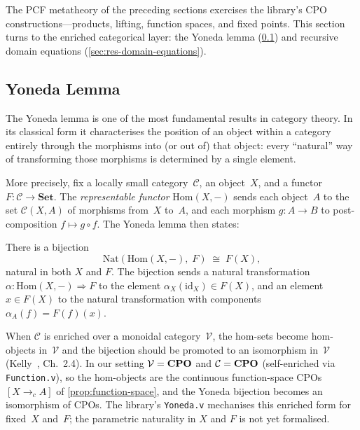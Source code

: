 The PCF metatheory of the preceding sections exercises the library's
CPO constructions---products, lifting, function spaces, and fixed
points.  This section turns to the enriched categorical layer:
the Yoneda lemma (\cref{sec:res-yoneda}) and recursive domain
equations (\cref{sec:res-domain-equations}).

\subsection{Yoneda Lemma}
\label{sec:res-yoneda}


The Yoneda lemma is one of the most fundamental results in category
theory.  In its classical form it characterises the position of an
object within a category entirely through the morphisms into (or out of)
that object: every ``natural'' way of transforming those morphisms is
determined by a single element.

More precisely, fix a locally small category~$\mathcal{C}$, an
object~$X$, and a functor $F : \mathcal{C} \to \mathbf{Set}$.  The
\emph{representable functor} $\mathrm{Hom}(X, -)$ sends each object~$A$
to the set $\mathcal{C}(X, A)$ of morphisms from~$X$ to~$A$, and each
morphism $g : A \to B$ to post-composition $f \mapsto g \circ f$.  The
Yoneda lemma then states:

\begin{theorem}
\label{thm:yoneda-set}
There is a bijection
\[
  \mathrm{Nat}(\mathrm{Hom}(X,-),\; F)
    \;\cong\;
  F(X),
\]
natural in both $X$ and $F$.  The bijection sends a natural
transformation $\alpha : \mathrm{Hom}(X,-) \Rightarrow F$ to the element
$\alpha_X(\mathrm{id}_X) \in F(X)$, and an element $x \in F(X)$ to the
natural transformation with components $\alpha_A(f) = F(f)(x)$.
\end{theorem}

\noindent
When $\mathcal{C}$ is enriched over a monoidal category~$\mathcal{V}$,
the hom-sets become hom-objects in~$\mathcal{V}$ and the bijection
should be promoted to an isomorphism in~$\mathcal{V}$
(Kelly~\cite{Kelly1982}, Ch.~2.4).
In our setting $\mathcal{V} = \mathbf{CPO}$ and
$\mathcal{C} = \mathbf{CPO}$ (self-enriched via \texttt{Function.v}), so the
hom-objects are the continuous function-space CPOs~$[X \to_c A]$ of
\cref{prop:function-space}, and the Yoneda bijection becomes an
isomorphism of CPOs.  The library's \texttt{Yoneda.v} mechanises this
enriched form for fixed~$X$ and~$F$; the parametric naturality in $X$
and $F$ is not yet formalised.

